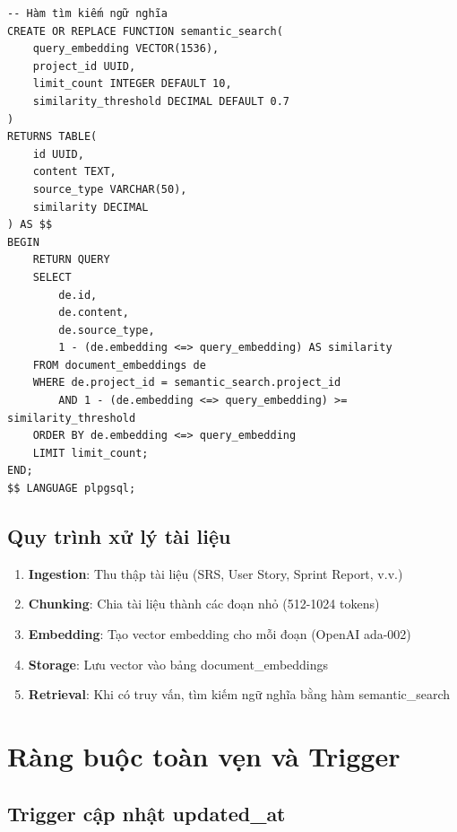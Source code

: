 \documentclass[12pt,a4paper]{report}
\begin{document}
\begin{verbatim}
-- Hàm tìm kiếm ngữ nghĩa
CREATE OR REPLACE FUNCTION semantic_search(
    query_embedding VECTOR(1536),
    project_id UUID,
    limit_count INTEGER DEFAULT 10,
    similarity_threshold DECIMAL DEFAULT 0.7
)
RETURNS TABLE(
    id UUID,
    content TEXT,
    source_type VARCHAR(50),
    similarity DECIMAL
) AS $$
BEGIN
    RETURN QUERY
    SELECT
        de.id,
        de.content,
        de.source_type,
        1 - (de.embedding <=> query_embedding) AS similarity
    FROM document_embeddings de
    WHERE de.project_id = semantic_search.project_id
        AND 1 - (de.embedding <=> query_embedding) >= similarity_threshold
    ORDER BY de.embedding <=> query_embedding
    LIMIT limit_count;
END;
$$ LANGUAGE plpgsql;
\end{verbatim}

\subsection{Quy trình xử lý tài liệu}

\begin{enumerate}
\item \textbf{Ingestion}: Thu thập tài liệu (SRS, User Story, Sprint Report, v.v.)
\item \textbf{Chunking}: Chia tài liệu thành các đoạn nhỏ (512-1024 tokens)
\item \textbf{Embedding}: Tạo vector embedding cho mỗi đoạn (OpenAI ada-002)
\item \textbf{Storage}: Lưu vector vào bảng document\_embeddings
\item \textbf{Retrieval}: Khi có truy vấn, tìm kiếm ngữ nghĩa bằng hàm semantic\_search
\end{enumerate}

\section{Ràng buộc toàn vẹn và Trigger}

\subsection{Trigger cập nhật updated\_at}
\end{document}
